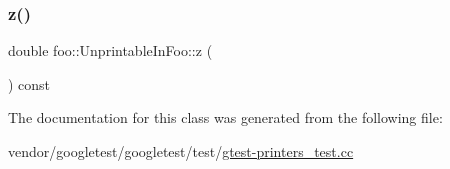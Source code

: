 \subsubsection{\texorpdfstring{z()}{z()}}
{\footnotesize\ttfamily double foo\+::\+Unprintable\+In\+Foo\+::z (\begin{DoxyParamCaption}{ }\end{DoxyParamCaption}) const\hspace{0.3cm}{\ttfamily [inline]}}



The documentation for this class was generated from the following file\+:\begin{DoxyCompactItemize}
\item 
vendor/googletest/googletest/test/\hyperlink{gtest-printers__test_8cc}{gtest-\/printers\+\_\+test.\+cc}\end{DoxyCompactItemize}
